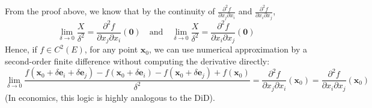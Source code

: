 \documentclass[12pt]{article}
\begin{document}
\begin{rmk}
From the proof above, we know that by the continuity of $\frac{\partial^2 f}{\partial x_j \partial x_i}$ and $\frac{\partial^2 f}{\partial x_i \partial x_j}$,
$$ \lim_{\delta \to 0} \frac{X}{\delta^2} = \frac{\partial^2 f}{\partial x_j \partial x_i}(\mathbf{0}) \quad \text{and} \quad \lim_{\delta \to 0} \frac{X}{\delta^2} = \frac{\partial^2 f}{\partial x_i \partial x_j}(\mathbf{0}) $$
Hence, if $f \in C^2(E)$, for any point $\mathbf{x}_0$, we can use numerical approximation by a second-order finite difference without computing the derivative directly:
$$ \lim_{\delta \to 0} \frac{f(\mathbf{x}_0 + \delta \mathbf{e}_i + \delta \mathbf{e}_j) - f(\mathbf{x}_0 + \delta \mathbf{e}_i) - f(\mathbf{x}_0 + \delta \mathbf{e}_j) + f(\mathbf{x}_0)}{\delta^2} = \frac{\partial^2 f}{\partial x_j \partial x_i}(\mathbf{x}_0) = \frac{\partial^2 f}{\partial x_i \partial x_j}(\mathbf{x}_0) $$
(In economics, this logic is highly analogous to the DiD).
\end{rmk}
\end{document}
